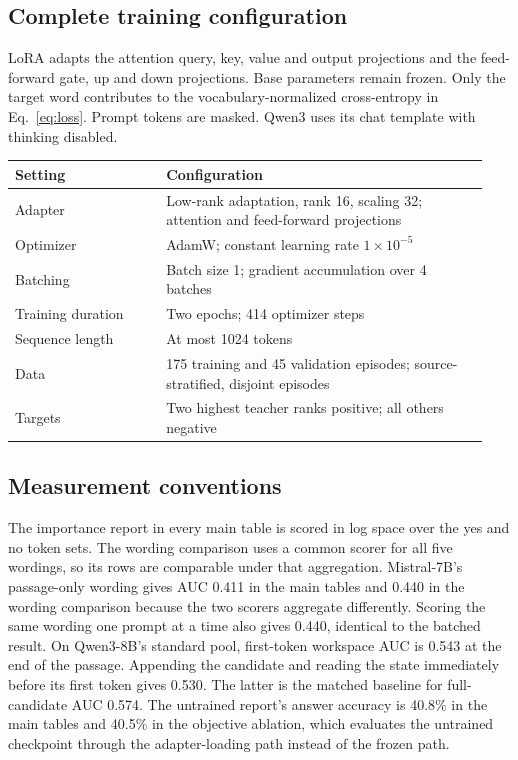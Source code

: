 \subsection{Complete training configuration}
\label{app:configuration}

LoRA adapts the attention query, key, value and output projections and
the feed-forward gate, up and down projections. Base parameters remain
frozen. Only the target word contributes to the vocabulary-normalized
cross-entropy in Eq.~\eqref{eq:loss}. Prompt tokens are masked. Qwen3
uses its chat template with thinking disabled.

\begin{center}
\small
\begin{tabular}{@{}p{0.30\linewidth}p{0.64\linewidth}@{}}
\toprule
Setting & Configuration \\
\midrule
Adapter & Low-rank adaptation, rank 16, scaling 32; attention and
feed-forward projections \\
Optimizer & AdamW; constant learning rate $1\times10^{-5}$ \\
Batching & Batch size 1; gradient accumulation over 4 batches \\
Training duration & Two epochs; 414 optimizer steps \\
Sequence length & At most 1024 tokens \\
Data & 175 training and 45 validation episodes; source-stratified, disjoint episodes \\
Targets & Two highest teacher ranks positive; all others negative \\
\bottomrule
\end{tabular}
\end{center}

\subsection{Measurement conventions}
\label{app:conventions}

The importance report in every main table is scored in log space over
the yes and no token sets. The wording comparison uses a common
scorer for all five wordings, so its rows are comparable under that
aggregation. Mistral-7B's passage-only wording gives AUC 0.411 in the
main tables and 0.440 in the wording comparison because the two
scorers aggregate differently. Scoring the same wording one prompt at
a time also gives 0.440, identical to the batched result.
On Qwen3-8B's standard pool, first-token workspace AUC is 0.543 at
the end of the passage. Appending the candidate and reading the state
immediately before its first token gives 0.530. The latter is the
matched baseline for full-candidate AUC 0.574.
The untrained report's answer accuracy is 40.8\% in the main tables
and 40.5\% in the objective ablation, which evaluates the untrained
checkpoint through the adapter-loading path instead of the frozen path.

